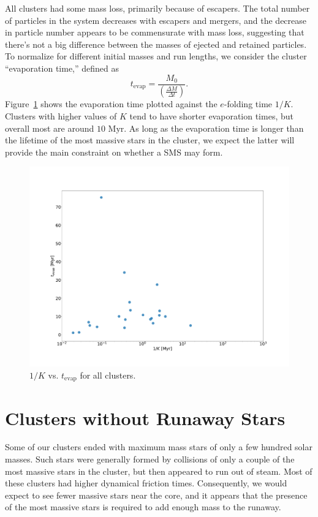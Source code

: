 \documentclass{princeton_astro_thesis}
\newcommand\Myr{\mbox{ Myr}}
\numberwithin{equation}{section}
\begin{document}
All clusters had some mass loss, primarily because of escapers. The total number of particles in the system decreases with escapers and mergers, and the decrease in particle number appears to be commensurate with mass loss, suggesting that there's not a big difference between the masses of ejected and retained particles. To normalize for different initial masses and run lengths, we consider the cluster ``evaporation time,'' defined as 
\begin{equation}
    t_{\mathrm{evap}} = \frac{M_{0}}{\left(\frac{\Delta M}{\Delta t}\right)}.
\end{equation}
Figure~\ref{fig:EvapKplot} shows the evaporation time plotted against the $e$-folding time $1/K$. Clusters with higher values of $K$ tend to have shorter evaporation times, but overall most are around $10 \Myr$.  As long as the evaporation time is longer than the lifetime of the most massive stars in the cluster, we expect the latter will provide the main constraint on whether a SMS may form.
\begin{figure}
\centering
\includegraphics[width=\textwidth]{kevap}
\caption{$1/K$ vs. $t_{\mathrm{evap}}$ for all clusters.}
\label{fig:EvapKplot}
\end{figure}

\section{Clusters without Runaway Stars}
Some of our clusters ended with maximum mass stars of only a few hundred solar masses. Such stars were generally formed by collisions of only a couple of the most massive stars in the cluster, but then appeared to run out of steam. Most of these clusters had higher dynamical friction times.  Consequently, we would expect to see fewer massive stars near the core, and it appears that the presence of the most massive stars is required to add enough mass to the runaway. 
\end{document}
